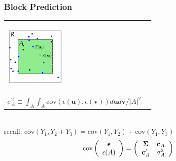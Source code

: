 \documentclass[mathserif,compress]{beamer}\usepackage{graphicx, color}
\def\bc{\mathbf{c}}
\def\bs{\mathbf{s}}
\def\bu{\mathbf{u}}
\def\bv{\mathbf{v}}
\def\bepsilon{\mbox{\boldmath $\epsilon$}}
\def\bSigma{\mbox{\boldmath $\Sigma$}}
\def\cov{\textrm{cov}}
\def\upp{^\prime}
\begin{document}
\begin{frame}[fragile]
\frametitle{Block Prediction}

	\begin{tabular} {p{3cm} p{6cm}}
		\begin{center}
			\vspace{-1cm}
			\includegraphics[width=3cm]{figure/BlockPred-plot} 
		\end{center} &
	\footnotesize
		\begin{itemize}
			\item $c_i(A) \equiv \cov(\epsilon(\bs_i),\epsilon(A)) = \int_{A} \cov(\epsilon(\bs_i), \epsilon(\bu)) d\bu/|A|$
			\item $\bc_A \equiv [c_1(A),\ldots,c_n(A)]$ \\
			\item $\sigma^2_A \equiv \int_{A}\int_{A} \cov(\epsilon(\bu), \epsilon(\bv)) d\bu d\bv /|A|^2$
		\end{itemize}

	\end{tabular} \\
	\footnotesize
	recall: $\cov(Y_1,Y_2 + Y_3) = \cov(Y_1,Y_2) + \cov(Y_1, Y_3)$ 
	\normalsize
	\[ 
		\cov\left(\begin{array}{c}
		\bepsilon \\ \epsilon(A)
		\end{array}\right) = 
		\left(\begin{array}{cc}
		\bSigma & \bc_A \\ \bc_A\upp & \sigma_A^2
		\end{array}\right)
	\]
\end{frame}

\end{document}
